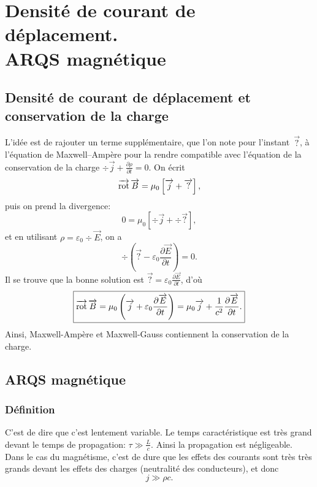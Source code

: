 \section[Densité de courant de déplacement]{Densité de courant de déplacement.\texorpdfstring{\\}{ }ARQS magnétique}
\subsection{Densité de courant de déplacement et conservation de la charge}

L'idée est de rajouter un terme supplémentaire, que l'on note pour l'instant~$\vec{?}$, à l'équation de Maxwell--Ampère pour la rendre compatible avec l'équation de la conservation de la charge $\div\vec{j}+\frac{\partial\rho}{\partial t}=0$.
On écrit 
\begin{equation}
    \operatorname{\overrightarrow{\text{rot}}}\protect\overrightarrow{{B}}=\mu_0\left[\protect\overrightarrow{{j}}+\protect\overrightarrow{{?}}\right],
\end{equation}
puis on prend la divergence:
\begin{equation}
    0=\mu_0\left[\div\vec{j}+\div\vec{?}\right],
\end{equation}
et en utilisant $\rho=\varepsilon_0\div\vec{E}$, on a 
\begin{equation}
    \div\left(\vec{?}-\varepsilon_0\frac{\partial\vec{E}}{\partial t}\right)=0.
\end{equation}
Il se trouve que la bonne solution est $\vec{?}=\varepsilon_0\frac{\partial\vec{E}}{\partial t}$, d'où
\begin{equation}
    \boxed{
        \operatorname{\overrightarrow{\text{rot}}}\protect\overrightarrow{{B}}=\mu_0\left(\protect\overrightarrow{{j}}+\varepsilon_0\frac{\partial\protect\overrightarrow{{E}}}{\partial t}\right)=\mu_0\protect\overrightarrow{{j}}+\frac{1}{c^{2}}\frac{\partial\protect\overrightarrow{{E}}}{\partial t}.
    }
\end{equation}
Ainsi, Maxwell-Ampère et Maxwell-Gauss contiennent la conservation de la charge.

\subsection{ARQS magnétique}
\subsubsection{Définition}
C'est de dire que c'est \og lentement variable\fg. Le temps caractéristique est très grand devant le temps de propagation: $\tau\gg\frac{L}{c}$. Ainsi la propagation est négligeable. Dans le cas du magnétisme, c'est de dure que les effets des courants sont très très grands devant les effets des charges (neutralité des conducteurs), et donc 
\begin{equation}
    \boxed{
        j\gg\rho c.
    }
\end{equation}


